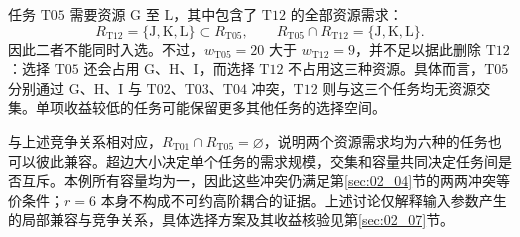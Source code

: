 任务 $\mathrm{T05}$ 需要资源 $\mathrm{G}$ 至 $\mathrm{L}$，其中包含了 $\mathrm{T12}$ 的全部资源需求：
\begin{equation}
 R_{\mathrm{T12}}=\{\mathrm{J},\mathrm{K},\mathrm{L}\}
 \subset R_{\mathrm{T05}},\qquad
 R_{\mathrm{T05}}\cap R_{\mathrm{T12}}
 =\{\mathrm{J},\mathrm{K},\mathrm{L}\}.
 \label{s0205:competition_05_12}
\end{equation}
因此二者不能同时入选。不过，$w_{\mathrm{T05}}=20$ 大于 $w_{\mathrm{T12}}=9$，并不足以据此删除 $\mathrm{T12}$：选择 $\mathrm{T05}$ 还会占用 $\mathrm{G}$、$\mathrm{H}$、$\mathrm{I}$，而选择 $\mathrm{T12}$ 不占用这三种资源。具体而言，$\mathrm{T05}$ 分别通过 $\mathrm{G}$、$\mathrm{H}$、$\mathrm{I}$ 与 $\mathrm{T02}$、$\mathrm{T03}$、$\mathrm{T04}$ 冲突，$\mathrm{T12}$ 则与这三个任务均无资源交集。单项收益较低的任务可能保留更多其他任务的选择空间。

与上述竞争关系相对应，$R_{\mathrm{T01}}\cap R_{\mathrm{T05}}=\varnothing$，说明两个资源需求均为六种的任务也可以彼此兼容。超边大小决定单个任务的需求规模，交集和容量共同决定任务间是否互斥。本例所有容量均为一，因此这些冲突仍满足第\ref{sec:02_04}节的两两冲突等价条件；$r=6$ 本身不构成不可约高阶耦合的证据。上述讨论仅解释输入参数产生的局部兼容与竞争关系，具体选择方案及其收益核验见第\ref{sec:02_07}节。